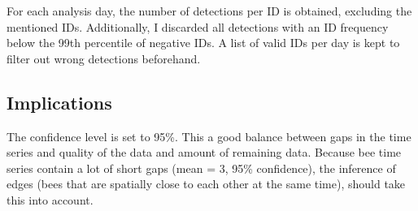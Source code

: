For each analysis day, the number of detections per ID is obtained, excluding the mentioned IDs.
Additionally, I discarded all detections with an ID frequency below the 99th percentile of negative IDs.
A list of valid IDs per day is kept to filter out wrong detections beforehand.

\subsection{Implications}
The confidence level is set to 95\%.
This a good balance between gaps in the time series and quality of the data and amount of remaining data.
Because bee time series contain a lot of short gaps (mean = 3, 95\% confidence), the inference of edges (bees that are spatially close to each other at the same time), should take this into account.